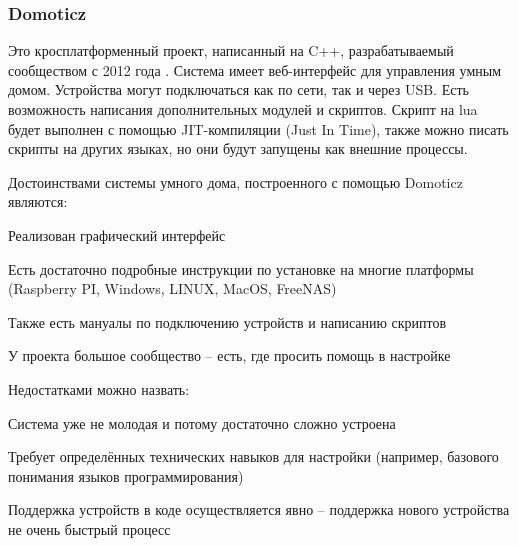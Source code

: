 \subsubsection{Domoticz}

Это кросплатформенный проект, написанный на C++, разрабатываемый сообществом с 2012 года \cite{DomoticzGitHub}.
Система имеет веб-интерфейс для управления умным домом. Устройства могут подключаться как по сети, так и через USB.
Есть возможность написания дополнительных модулей и скриптов. Скрипт на lua будет выполнен с помощью JIT-компиляции (Just In Time),
также можно писать скрипты на других языках, но они будут запущены как внешние процессы.

Достоинствами системы умного дома, построенного с помощью Domoticz являются:
\begin{list}{}{}
    \item Реализован графический интерфейс
    \item Есть достаточно подробные инструкции по установке на многие платформы (Raspberry PI, Windows, LINUX, MacOS, FreeNAS)
    \item Также есть мануалы по подключению устройств и написанию скриптов
    \item У проекта большое сообщество -- есть, где просить помощь в настройке
\end{list}
Недостатками можно назвать:
\begin{list}{}{}
    \item Система уже не молодая и потому достаточно сложно устроена
    \item Требует определённых технических навыков для настройки (например, базового понимания языков программирования)
    \item Поддержка устройств в коде осуществляется явно -- поддержка нового устройства не очень быстрый процесс
\end{list}
